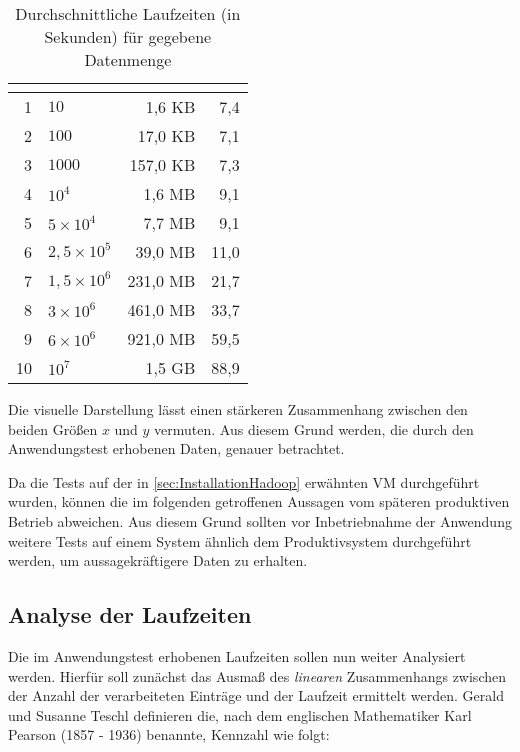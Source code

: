 \begin{table}
	\centering
	\begin{tabular}{| r | l | r | r |}
		\hline
		\rowcolor[HTML]{3531FF} 
		\multicolumn{1}{|l|}{\cellcolor[HTML]{4F88BB}{\color[HTML]{FFFFFF} {\bf \#}}} & \multicolumn{1}{l|}{\cellcolor[HTML]{4F88BB}{\color[HTML]{FFFFFF} {\bf Anzahl Einträge}}} & \multicolumn{1}{l|}{\cellcolor[HTML]{4F88BB}{\color[HTML]{FFFFFF} {\bf Dateigröße}}} & \multicolumn{1}{l|}{\cellcolor[HTML]{4F88BB}{\color[HTML]{FFFFFF} {\bf Laufzeit}}} \\ \hline
		1 & $10$ & 1,6 \ac{KB} & 7,4 \\  \hline
		2 & $100$ & 17,0 \ac{KB} & 7,1 \\ \hline
		3 & $1000$ & 157,0 \ac{KB} & 7,3 \\  \hline \hline
		4 & $10^4$ & 1,6 \ac{MB} & 9,1 \\  \hline
		5 & $5\times10^4$ & 7,7 \ac{MB} & 9,1 \\  \hline
		6 & $2,5\times10^5$ & 39,0 \ac{MB} & 11,0 \\  \hline
		7 & $1,5\times10^6$ & 231,0 \ac{MB} & 21,7 \\  \hline
		8 & $3\times10^6$ & 461,0 \ac{MB} & 33,7 \\  \hline
		9 & $6\times10^6$ & 921,0 \ac{MB} & 59,5 \\  \hline \hline
		10 & $10^7$ & 1,5 \ac{GB} & 88,9 \\  \hline
	\end{tabular}
	\caption{Durchschnittliche Laufzeiten (in Sekunden) für gegebene Datenmenge}
	\label{tbl:DurchschnittlicheLaufzeiten}
\end{table}

Die visuelle Darstellung lässt einen stärkeren Zusammenhang zwischen den beiden Größen $x$ und $y$ vermuten. Aus diesem Grund werden, die durch den Anwendungstest erhobenen Daten, genauer betrachtet.

Da die Tests auf der in \autoref{sec:InstallationHadoop} erwähnten \ac{VM} durchgeführt wurden, können die im folgenden getroffenen Aussagen vom späteren produktiven Betrieb abweichen. Aus diesem Grund sollten vor Inbetriebnahme der Anwendung weitere Tests auf einem System ähnlich dem Produktivsystem durchgeführt werden, um aussagekräftigere Daten zu erhalten.

\subsection{Analyse der Laufzeiten}
Die im Anwendungstest erhobenen Laufzeiten sollen nun weiter Analysiert werden. Hierfür soll zunächst das Ausmaß des \textit{linearen} Zusammenhangs zwischen der Anzahl der verarbeiteten Einträge und der Laufzeit ermittelt werden. Gerald und Susanne Teschl definieren die, nach dem englischen Mathematiker Karl Pearson (1857 - 1936) benannte, Kennzahl wie folgt:

